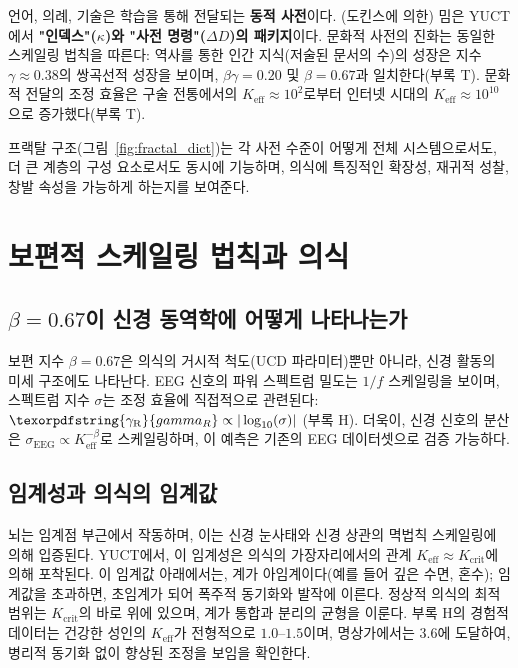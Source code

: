\documentclass[12pt,a4paper]{article}
\DeclareRobustCommand{\gaR}{\texorpdfstring{\ensuremath{\gamma_{\mathrm{R}}}}{gamma_R}}
\newcommand{\eff}{\mathrm{eff}}
\newcommand{\Ke}{K_{\eff}}
\newcommand{\Kcrit}{K_{\mathrm{crit}}}
\begin{document}
	언어, 의례, 기술은 학습을 통해 전달되는 \textbf{동적 사전}이다. (도킨스에 의한) 밈은 YUCT에서 \textbf{"인덱스"(\(\kappa\))와 "사전 명령"(\(\Delta D\))의 패키지}이다. 문화적 사전의 진화는 동일한 스케일링 법칙을 따른다: 역사를 통한 인간 지식(저술된 문서의 수)의 성장은 지수 \(\gamma \approx 0.38\)의 쌍곡선적 성장을 보이며, \(\beta\gamma = 0.20\) 및 \(\beta = 0.67\)과 일치한다(부록 T). 문화적 전달의 조정 효율은 구술 전통에서의 \(\Ke \approx 10^2\)로부터 인터넷 시대의 \(\Ke \approx 10^{10}\)으로 증가했다(부록 T).
	
	프랙탈 구조(그림~\ref{fig:fractal_dict})는 각 사전 수준이 어떻게 전체 시스템으로서도, 더 큰 계층의 구성 요소로서도 동시에 기능하며, 의식에 특징적인 확장성, 재귀적 성찰, 창발 속성을 가능하게 하는지를 보여준다.
	
	\section{보편적 스케일링 법칙과 의식}
	
	\subsection{\(\beta = 0.67\)이 신경 동역학에 어떻게 나타나는가}
	
	보편 지수 \(\beta = 0.67\)은 의식의 거시적 척도(UCD 파라미터)뿐만 아니라, 신경 활동의 미세 구조에도 나타난다. EEG 신호의 파워 스펙트럼 밀도는 \(1/f\) 스케일링을 보이며, 스펙트럼 지수 \(\sigma\)는 조정 효율에 직접적으로 관련된다: \(\gaR \propto |\log_{10}(\sigma)|\) (부록 H). 더욱이, 신경 신호의 분산은 \(\sigma_{\text{EEG}} \propto \Ke^{-\beta}\)로 스케일링하며, 이 예측은 기존의 EEG 데이터셋으로 검증 가능하다.
	
	\subsection{임계성과 의식의 임계값}
	
	뇌는 임계점 부근에서 작동하며, 이는 신경 눈사태와 신경 상관의 멱법칙 스케일링에 의해 입증된다. YUCT에서, 이 임계성은 의식의 가장자리에서의 관계 \(\Ke \approx \Kcrit\)에 의해 포착된다. 이 임계값 아래에서는, 계가 아임계이다(예를 들어 깊은 수면, 혼수); 임계값을 초과하면, 초임계가 되어 폭주적 동기화와 발작에 이른다. 정상적 의식의 최적 범위는 \(\Kcrit\)의 바로 위에 있으며, 계가 통합과 분리의 균형을 이룬다. 부록 H의 경험적 데이터는 건강한 성인의 \(\Ke\)가 전형적으로 \(1.0\)--\(1.5\)이며, 명상가에서는 \(3.6\)에 도달하여, 병리적 동기화 없이 향상된 조정을 보임을 확인한다.
	
\end{document}
